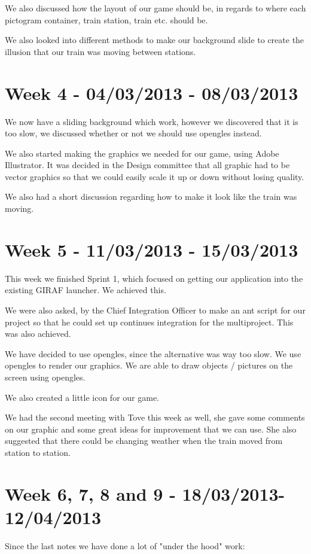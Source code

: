 We also discussed how the layout of our game should be, in regards to where each pictogram container, train station, train etc. should be. 

We also looked into different methods to make our background slide to create the illusion that our train was moving between stations. 

\section*{Week 4 - 04/03/2013 - 08/03/2013}
We now have a sliding background which work, however we discovered that it is too slow, we discussed whether or not we should use \ac{opengles} instead. 

We also started making the graphics we needed for our game, using Adobe Illustrator. It was decided in the Design committee that all graphic had to be vector graphics so that we could easily scale it up or down without losing quality. 

We also had a short discussion regarding how to make it look like the train was moving.

\section*{Week 5 - 11/03/2013 - 15/03/2013}
This week we finished Sprint 1, which focused on getting our application into the existing GIRAF launcher. We achieved this. 

We were also asked, by the Chief Integration Officer to make an ant script for our project so that he could set up continues integration for the multiproject. This was also achieved. 

We have decided to use \ac{opengles}, since the alternative was way too slow. We use \ac{opengles} to render our graphics. We are able to draw objects / pictures on the screen using \ac{opengles}. 

We also created a little icon for our game. 

We had the second meeting with Tove this week as well, she gave some comments on our graphic and some great ideas for improvement that we can use. She also suggested that there could be changing weather when the train moved from station to station. 

\section*{Week 6, 7, 8 and 9 - 18/03/2013-12/04/2013}
Since the last notes we have done a lot of "under the hood" work:

